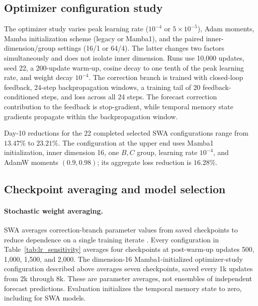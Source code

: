 \documentclass{article}
\newcommand{\vfourchange}[1]{{\color{blue}#1}}
\begin{document}
\FloatBarrier
\subsection{\texorpdfstring{{Optimizer configuration study}}{Optimizer configuration study}}
\label{app:optimizer_study}
\vfourchange{{These optimizer comparisons use the 2022 development set.}}
The optimizer study varies peak learning rate ($10^{-4}$ or $5\times10^{-5}$), Adam moments, Mamba initialization scheme (legacy or Mamba1), and the paired inner-dimension/group settings (16/1 or 64/4). The latter changes two factors simultaneously and does not isolate inner dimension. Runs use 10,000 updates, seed 22, a 200-update warm-up, cosine decay to one tenth of the peak learning rate, and weight decay $10^{-4}$. {The correction branch is trained} with closed-loop feedback, 24-step backpropagation windows, a training tail of 20 feedback-conditioned steps, and loss across all 24 steps. {The forecast correction contribution to the feedback} is stop-gradient, while temporal memory state gradients propagate within the backpropagation window.

Day-10 reductions for the 22 completed selected SWA configurations range from $13.47\%$ to $23.21\%$. The configuration at the upper end uses Mamba1 initialization, inner dimension 16, one $B,C$ group, learning rate $10^{-4}$, and AdamW moments $(0.9,0.98)$; its aggregate loss reduction is $16.28\%$.

\subsection{\texorpdfstring{{Checkpoint averaging and model selection}}{Checkpoint averaging and model selection}}
\label{app:checkpoint_selection}
\begin{samepage}
\paragraph{Stochastic weight averaging.}
{SWA averages correction-branch parameter values} from saved checkpoints to reduce dependence on a single training iterate \citep{izmailov2019averagingweightsleadswider}. Every configuration in {Table~\ref{tab:lr_sensitivity}} averages four checkpoints at {post-warm-up updates} 500, 1,000, 1,500, and 2,000. The dimension-16 Mamba1-initialized optimizer-study configuration described above averages seven checkpoints, saved every 1k updates from 2k through 8k. These are parameter averages, not ensembles of independent forecast predictions. {Evaluation initializes the temporal memory state to zero}, including for SWA models.
\end{samepage}
\end{document}

